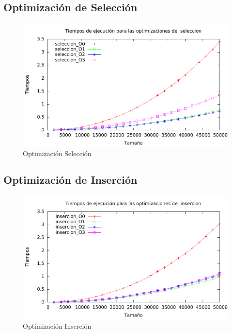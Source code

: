 \documentclass[a4paper, 11pt]{article}
\begin{document}
\subsection{Optimización de Selección}

\begin{figure}[H]\includegraphics[width=13cm]{img/seleccion_optim_g.pdf} \centering
	\caption{Optimización Selección}\end{figure}

\subsection{Optimización de Inserción}

\begin{figure}[H]\includegraphics[width=13cm]{img/insercion_optim_g.pdf} \centering
	\caption{Optimización Inserción}\end{figure}
\end{document}
